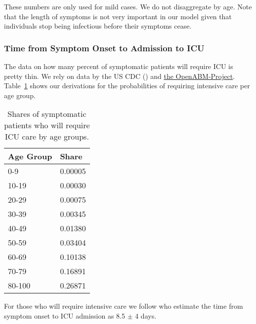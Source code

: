 These numbers are only used for mild cases. We do not disaggregate by age. Note that the
length of symptoms is not very important in our model given that individuals stop being
infectious before their symptoms cease.


\subsubsection{Time from Symptom Onset to Admission to ICU}

The data on how many percent of symptomatic patients will require ICU is pretty thin. We
rely on data by the US CDC (\citet{Stokes2020}) and
\href{https://github.com/BDI-pathogens/OpenABM-Covid19/blob/572e24ca2dbf7153789a92ad3a27e4c515d0e576/documentation/parameters/parameter_dictionary.md}{the
OpenABM-Project}. Table~\ref{tab:symptomatic-to-ICU} shows our derivations for the
probabilities of requiring intensive care per age group.

\begin{table}[tb]
    \caption{Shares of symptomatic patients who will require ICU care by age groups.}
    \label{tab:symptomatic-to-ICU}
    \centering

    \begin{tabular}{ll}
        \toprule
        Age Group & Share \\
        \midrule
        0-9 & 0.00005 \\
        10-19 & 0.00030 \\
        20-29 & 0.00075 \\
        30-39 & 0.00345 \\
        40-49 & 0.01380 \\
        50-59 & 0.03404 \\
        60-69 & 0.10138 \\
        70-79 & 0.16891 \\
        80-100 & 0.26871 \\
        \bottomrule
    \end{tabular}


\end{table}

For those who will require intensive care we follow \citet{Chen2020} who estimate the
time from symptom onset to ICU admission as 8.5 $\pm$ 4 days.

